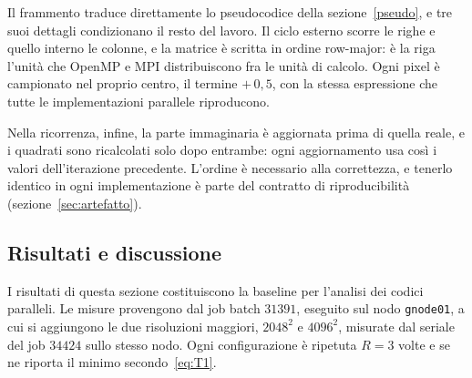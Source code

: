 Il frammento traduce direttamente lo pseudocodice della
sezione~\ref{pseudo}, e tre suoi dettagli condizionano il resto del lavoro. Il
ciclo esterno scorre le righe e quello interno le colonne, e la matrice è
scritta in ordine row-major: è la riga l'unità che OpenMP e MPI distribuiscono
fra le unità di calcolo. Ogni pixel è campionato nel proprio centro, il termine
$+\,0{,}5$, con la stessa espressione che tutte le implementazioni parallele
riproducono.

Nella ricorrenza, infine, la parte immaginaria è aggiornata prima di quella
reale, e i quadrati sono ricalcolati solo dopo entrambe: ogni aggiornamento usa
così i valori dell'iterazione precedente. L'ordine è necessario alla
correttezza, e tenerlo identico in ogni implementazione è parte del contratto di
riproducibilità (sezione~\ref{sec:artefatto}).

\subsection{Risultati e discussione}
\label{serial_results}
I risultati di questa sezione costituiscono la baseline per l'analisi dei codici
paralleli. Le misure provengono dal job batch $31391$, eseguito sul nodo
\texttt{gnode01}, a cui si aggiungono le due risoluzioni maggiori, $2048^2$ e
$4096^2$, misurate dal seriale del job $34424$ sullo stesso nodo. Ogni
configurazione è ripetuta $R = 3$ volte e se ne riporta il minimo
secondo~\eqref{eq:T1}.

\vspace{2,5mm}

